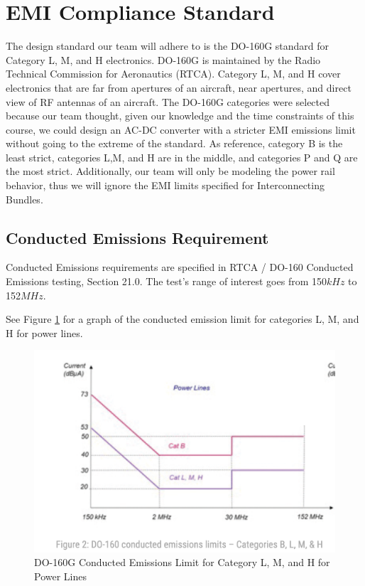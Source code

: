 \documentclass[conference]{IEEEtran}
\begin{document}
\section{EMI Compliance Standard}

The design standard our team will adhere to is the DO-160G standard for Category L, M, and H electronics. DO-160G is maintained by the Radio Technical Commission for Aeronautics (RTCA). Category L, M, and H cover electronics that are far from apertures of an aircraft, near apertures, and direct view of RF antennas of an aircraft. The DO-160G categories were selected because our team thought, given our knowledge and the time constraints of this course, we could design an AC-DC converter with a stricter EMI emissions limit without going to the extreme of the standard. As reference, category B is the least strict, categories L,M, and H are in the middle, and categories P and Q are the most strict. Additionally, our team will only be modeling the power rail behavior, thus we will ignore the EMI limits specified for Interconnecting Bundles.

\subsection{Conducted Emissions Requirement}

Conducted Emissions requirements are specified in RTCA / DO-160 Conducted Emissions testing, Section 21.0. The test's range of interest goes from 150${kHz}$ to 152${MHz}$.

See Figure \ref{fig:do-160g_conducted_emissions_limit_diagram} for a graph of the conducted emission limit for categories L, M, and H for power lines.

\begin{figure}[htbp]
    \centering
    \includegraphics[width=1.0\linewidth]{do-160g_conducted_emissions_limit.png}
    \caption{DO-160G Conducted Emissions Limit for Category L, M, and H for Power Lines}
    \label{fig:do-160g_conducted_emissions_limit_diagram}
\end{figure}
\end{document}

